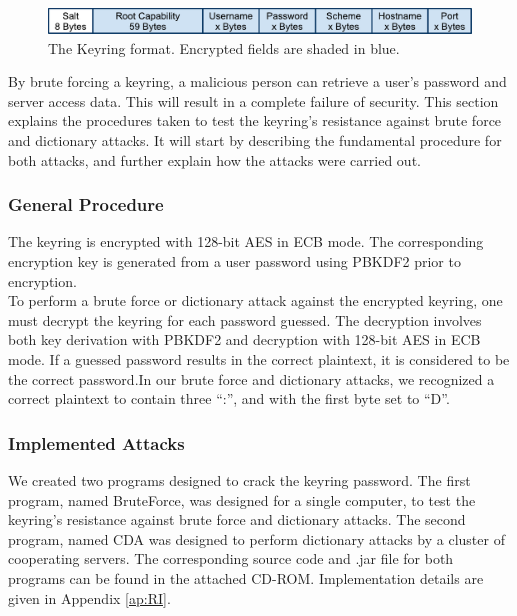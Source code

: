 \documentclass[pdftex,english,10pt,b5paper,twoside]{book}
\begin{document}
\begin{figure}[h!]
    \centering
    \includegraphics[scale=0.6]{KeyringFormat.pdf}
    \caption{The Keyring format. Encrypted fields are shaded in blue.}
    \label{fig:KeyringFormat}
\end{figure}

\noindent By brute forcing a keyring, a malicious person can retrieve a user's password and server
access data. This will result in a complete failure of security. This section
explains the procedures taken to test the keyring's resistance against brute
force and dictionary attacks. It will start by describing the fundamental procedure for
both attacks, and further explain how the attacks were carried out.

\subsubsection{General Procedure}
The keyring is encrypted with 128-bit AES in ECB mode. The corresponding
encryption key is generated from a user password using PBKDF2 prior to
encryption.\\

\noindent To perform a brute force or dictionary attack against the encrypted
keyring, one must decrypt the keyring for each password guessed. The decryption
involves both key derivation with PBKDF2 and decryption with 128-bit AES in ECB
mode. If a guessed password results in the correct plaintext, it is
considered to be the correct password.In our brute force and dictionary
attacks, we recognized a correct plaintext to contain three ``:'', and with the
first byte set to ``D''.

\subsubsection{Implemented Attacks}
We created two programs designed to crack the keyring password. The first program,
named BruteForce, was designed for a single computer, to test the keyring's
resistance against brute force and dictionary attacks. The second program, named
\ac{CDA} was designed to perform dictionary attacks by a cluster of cooperating
servers. The corresponding source code and .jar file for both programs can be found in the
attached CD-ROM. Implementation details are given in Appendix \ref{ap:RI}.
\end{document}
